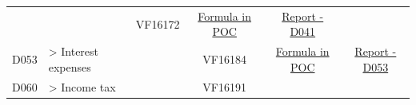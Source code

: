\documentclass[]{book}
\begin{document}
\begin{longtable}[]{@{}cllccc@{}}
\begin{minipage}[t]{0.20\columnwidth}
\end{minipage} & \begin{minipage}[t]{0.16\columnwidth}\raggedright
\strut
\end{minipage} & \begin{minipage}[t]{0.09\columnwidth}\centering
VF16172\strut
\end{minipage} & \begin{minipage}[t]{0.15\columnwidth}\centering
\protect\hyperlink{d041---formula-in-poc}{Formula in POC}\strut
\end{minipage} & \begin{minipage}[t]{0.16\columnwidth}\centering
\href{./Auxiliary\%20Files/technical_reports/variable_report/D041(!).pdf}{Report - D041}\strut
\end{minipage}\tabularnewline
\begin{minipage}[t]{0.08\columnwidth}\centering
D053\strut
\end{minipage} & \begin{minipage}[t]{0.20\columnwidth}\raggedright
\textgreater{} Interest expenses\strut
\end{minipage} & \begin{minipage}[t]{0.16\columnwidth}\raggedright
\strut
\end{minipage} & \begin{minipage}[t]{0.09\columnwidth}\centering
VF16184\strut
\end{minipage} & \begin{minipage}[t]{0.15\columnwidth}\centering
\protect\hyperlink{d053---formula-in-poc}{Formula in POC}\strut
\end{minipage} & \begin{minipage}[t]{0.16\columnwidth}\centering
\href{./Auxiliary\%20Files/technical_reports/variable_report/D053(!).pdf}{Report - D053}\strut
\end{minipage}\tabularnewline
\begin{minipage}[t]{0.08\columnwidth}\centering
D060\strut
\end{minipage} & \begin{minipage}[t]{0.20\columnwidth}\raggedright
\textgreater{} Income tax\strut
\end{minipage} & \begin{minipage}[t]{0.16\columnwidth}\raggedright
\strut
\end{minipage} & \begin{minipage}[t]{0.09\columnwidth}\centering
VF16191\strut
\end{minipage} & \begin{minipage}[t]{0.15\columnwidth}\centering

\end{minipage}
\end{longtable}
\end{document}
